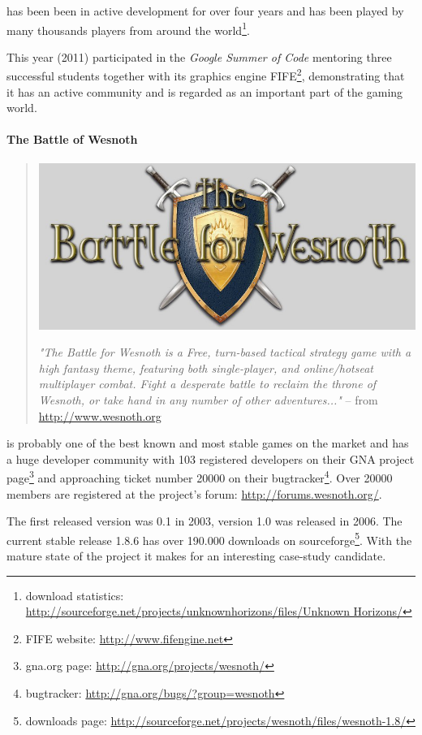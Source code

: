 \UH{} has been been in active development for over four years and has been played by many thousands players from around
the world\footnote{\UH{} download statistics: \url{http://sourceforge.net/projects/unknownhorizons/files/Unknown
Horizons/}}. 

This year (2011) \UH{} participated in the \textit{Google Summer of Code} mentoring three successful students
together with its graphics engine FIFE\footnote{FIFE website: \url{http://www.fifengine.net}}, demonstrating that it has
an active community and is regarded as an important part of the \OS{} gaming world.

\paragraph{The Battle of Wesnoth}
\begin{quote}
\begin{center}\includegraphics[scale=0.4]{pics/wesnothlogo}\end{center}
\textit{"The Battle for Wesnoth is a Free, turn-based tactical strategy game with a high fantasy theme, featuring both
single-player, and online/hotseat multiplayer combat. Fight a desperate battle to reclaim the throne of Wesnoth, or take
hand in any number of other adventures..."} -- from \url{http://www.wesnoth.org}
\end{quote}

\BOW{} is probably one of the best known and most stable \OS{} games on the market and has a huge developer community
with 103 registered developers on their GNA project page\footnote{\BOW{} gna.org page:
\url{http://gna.org/projects/wesnoth/}} and approaching ticket number 20000 on their bugtracker\footnote{\BOW{}
bugtracker: \url{http://gna.org/bugs/?group=wesnoth}}. Over 20000 members are registered at the project's forum:
\url{http://forums.wesnoth.org/}.

The first released version was 0.1 in 2003, version 1.0 was released in 2006. The current stable release 1.8.6 has over
190.000 downloads on sourceforge\footnote{\BOW{} downloads page:
\url{http://sourceforge.net/projects/wesnoth/files/wesnoth-1.8/}}. With the mature state of the project it makes for
an interesting case-study candidate.

